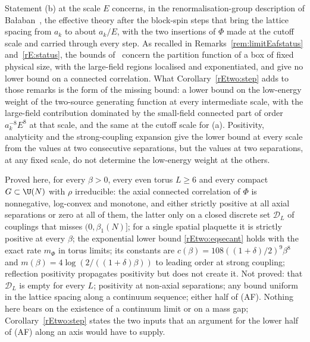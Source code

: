 \begin{remark}\label{rEtwo:balaban}
Statement (b) at the scale $E$ concerns, in the renormalisation-group
description of Ba{\l}aban~\cite{Bal87,Bal88,Bal89b}, the effective theory
after the block-spin steps that bring the lattice spacing from $a_k$ to
about $a_k/E$, with the two insertions of $\Phi$ made at the cutoff scale
and carried through every step. As recalled in
Remarks~\ref{rem:limitEafstatus} and~\ref{rE:status}, the bounds
of~\cite{Bal89b} concern the partition function of a box of fixed physical
size, with the large-field regions localised and exponentiated, and give
no lower bound on a connected correlation. What Corollary~\ref{rEtwo:step}
adds to those remarks is the form of the missing bound: a lower bound on
the low-energy weight of the two-source generating function at every
intermediate scale, with the large-field contribution dominated by the
small-field connected part of order $a_k^{-8}E^8$ at that scale, and the
same at the cutoff scale for (a). Positivity, analyticity and the
strong-coupling expansion give the lower bound at every scale from the
values at two consecutive separations, but the values at two separations,
at any fixed scale, do not determine the low-energy weight at the others.
\end{remark}

\begin{remark}[status]\label{rEtwo:status2}
Proved here, for every $\beta>0$, every even torus $L\ge6$ and every
compact $G\subset\U(N)$ with $\rho$ irreducible: the axial connected
correlation of $\Phi$ is nonnegative, log-convex and monotone, and either
strictly positive at all axial separations or zero at all of them, the
latter only on a closed discrete set $\mathcal D_L$ of couplings that
misses $(0,\beta_1(N)]$; for a single spatial plaquette it is strictly
positive at every $\beta$; the exponential lower bound
\eqref{rEtwo:eqsecant} holds with the exact rate $m_\Phi$ in torus limits;
its constants are $c(\beta)=108((1+\delta)/2)^9\beta^8$ and $m(\beta)=4
\log(2/((1+\delta)\beta))$ to leading order at strong coupling; reflection
positivity propagates positivity but does not create it. Not proved: that
$\mathcal D_L$ is empty for every $L$; positivity at non-axial
separations; any bound uniform in the lattice spacing along a continuum
sequence; either half of (AF). Nothing here bears on the existence of a
continuum limit or on a mass gap; Corollary~\ref{rEtwo:step} states the two
inputs that an argument for the lower half of (AF) along an axis would
have to supply.
\end{remark}

